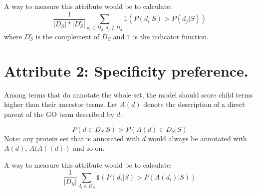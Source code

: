 \documentclass{specification}
\begin{document}

A way to measure this attribute would be to calculate: 
\[\frac{1}{|D_{S}|*|D_{S}^{c}|}\sum_{d_i \in D_{S}, d_j \notin D_{S}} \mathds{1}(P(d_i | S) > P(d_j | S))\]
where $D_{S}^{c}$ is the complement of $D_{S}$ and $\mathds{1}$ is the indicator function.

\section*{Attribute 2: Specificity preference.}

Among terms that do annotate the whole set, the model should score child terms higher than their ancestor terms. Let $A(d)$ denote the description of a direct parent of the GO term described by $d$.

\[P(d \in D_{S}| S) > P(A(d) \in D_{S}| S)\]
Note: any protein set that is annotated with $d$ would always be annotated with $A(d)$, $A(A((d))$ and so on.


A way to measure this attribute would be to calculate:
\[\frac{1}{|D_{S}|}\sum_{d_i \in D_{S}} \mathds{1}(P(d_i | S) > P(A(d_i) | S))\]







\end{document}

